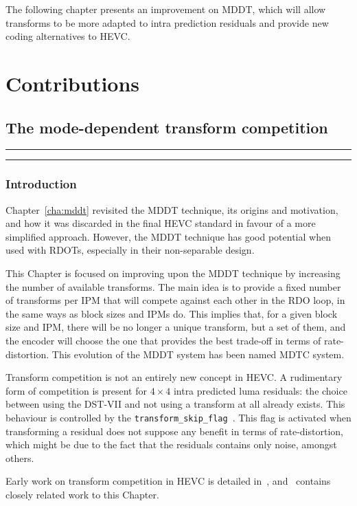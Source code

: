 \documentclass[11pt,a4paper,openright,twoside]{book}
\providecommand{\chaptertoc}{
	\startcontents[chapters]
	\hrule
	\vspace{1em}
	\printcontents[chapters]{}{1}{{\bf\large Contents}}
	\hrule
}
\numberwithin{equation}{section} %
\numberwithin{figure}{section} %
\numberwithin{table}{section} %
\begin{document}
The following chapter presents an improvement on \ac{MDDT}, which will allow
transforms to be more adapted to intra prediction residuals and provide new
coding alternatives to \ac{HEVC}.

\part{Contributions}
\label{prt:contributions}

\chapter{The mode-dependent transform competition}
\label{cha:mdtc}
\chaptertoc

\section{Introduction}
\label{sec:introduction_mdtc}

Chapter~\ref{cha:mddt} revisited the \acf{MDDT} technique, its origins and
motivation, and how it was discarded in the final \ac{HEVC} standard in favour
of a more simplified approach.
However, the \ac{MDDT} technique has good potential when used with \acp{RDOT},
especially in their non-separable design.

This Chapter is focused on improving upon the \ac{MDDT} technique by
increasing the number of available transforms.
The main idea is to provide a fixed number of transforms per \acf{IPM} that
will compete against each other in the \ac{RDO} loop, in the same ways as
block sizes and \acp{IPM} do.
This implies that, for a given block size and \ac{IPM}, there will be no
longer a unique transform, but a set of them, and the encoder will choose the
one that provides the best trade-off in terms of rate-distortion.
This evolution of the \ac{MDDT} system has been named \ac{MDTC} system.

Transform competition is not an entirely new concept in \ac{HEVC}.
A rudimentary form of competition is present for $4\times4$ intra predicted
luma residuals:
the choice between using the \ac{DST}-VII and not using a transform at all
already exists.
This behaviour is controlled by the
\texttt{transform\_skip\_flag}~\cite{JCTVC-F077, JCTVC-H0208}.
This flag is activated when transforming a residual does not suppose any
benefit in terms of rate-distortion, which might be due to the fact that the
residuals contains only noise, amongst others.

Early work on transform competition in \ac{HEVC} is detailed
in~\cite{arrufat-14-transform-competition-rdot}, and~\cite{arrufat-15-mdtc}
contains closely related work to this Chapter.
\end{document}
